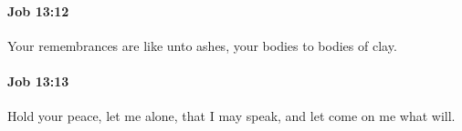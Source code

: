 		\paragraph{Job 13:12} %
			\label{JOB-13-12}

			Your remembrances are like unto ashes, your bodies to bodies of clay.


		\paragraph{Job 13:13} %
			\label{JOB-13-13}

			Hold your peace, let me alone, that I may speak, and let come on me what will.


